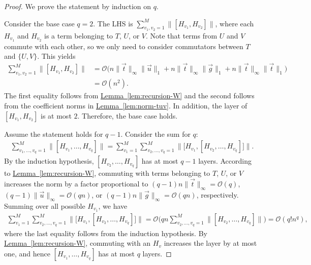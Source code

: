 \documentclass[aps,pra,reprint,groupedaddress,floatfix]{revtex4-2}
\newcommand{\lem}[1]{\hyperref[lem:#1]{Lemma~\ref*{lem:#1}}}
\begin{document}
\begin{proof}
    We prove the statement by induction on $q$. 
    
    Consider the base case $q=2$. The LHS is $\sum_{v_1, v_2=1}^{M} \|[H_{v_1}, H_{v_2}]\|$, where each $H_{v_1}$ and $H_{v_2}$ is a term belonging to $T$, $U$, or $V$. Note that terms from $U$ and $V$ commute with each other, so we only need to consider commutators between $T$ and $\{U,V\}$. This yields
    \begin{align*}
        \sum_{v_1, v_2=1}^{M} \|[H_{v_1}, H_{v_2}]\| 
        &= \mathcal{O}\big(n\|\vec{t}\|_{\infty} \|\vec{u}\|_1+ n\|\vec{t}\|_{\infty} \|\vec{g}\|_1 + n\|\vec{t}\|_{\infty} \|\vec{t}\|_1\big) \\
        &= \mathcal{O}(n^2).
    \end{align*}
    The first equality follows from \lem{recursion-W} and the second follows from the coefficient norms in \lem{norm-tuv}. In addition, the layer of $[H_{v_1}, H_{v_2}]$ is at most $2$. Therefore, the base case holds. 
    
    Assume the statement holds for $q-1$. Consider the sum for $q$: 
    \begin{align*}
         \sum_{v_1, \ldots, v_q=1}^{M} \|[H_{v_1}, \ldots, H_{v_q}]\| = \sum_{v_1=1}^M  \sum_{v_2, \ldots, v_q=1}^{M} \Big\| \big[H_{v_1}, [H_{v_2}, \ldots, H_{v_q}] \big] \Big\|. 
    \end{align*} 
    By the induction hypothesis, $[H_{v_2}, \ldots, H_{v_q}]$ has at most $q-1$ layers.
    According to \lem{recursion-W}, commuting with terms belonging to $T$, $U$, or $V$ increases the norm by a factor proportional to $(q-1)n\|\vec{t}\|_\infty = \mathcal{O}(q)$, $(q-1)\|\vec{u}\|_\infty =\mathcal{O}(qn)$, or $(q-1)n\|\vec{g}\|_\infty=\mathcal{O}(qn)$, respectively. Summing over all possible $H_{v_1}$, we have
    \begin{align*}
        \sum_{v_1=1}^M \sum_{v_2, \ldots, v_q=1}^{M} \Big\| \big[H_{v_1}, [H_{v_2}, \ldots, H_{v_q}] \big] \Big\| 
        = \mathcal{O}\Big(qn \sum_{v_2, \ldots, v_q=1}^{M} \|[H_{v_2}, \ldots, H_{v_q}]\|\Big) 
        = \mathcal{O}(q!n^{q}),
    \end{align*}
    where the last equality follows from the induction hypothesis. By \lem{recursion-W}, commuting with an $H_v$ increases the layer by at most one, and hence $[H_{v_1}, \ldots, H_{v_q}]$ has at most $q$ layers.
\end{proof}
\end{document}
